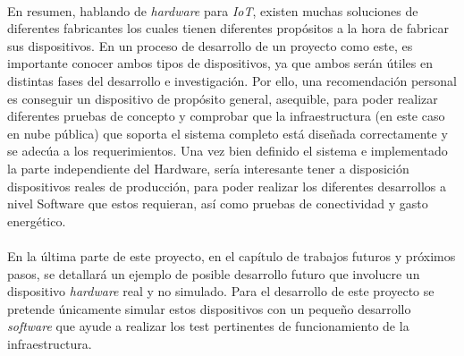 \documentclass[../../memoria.tex]{subfiles}
\begin{document}
\paragraph{}
En resumen, hablando de \textit{hardware} para \textit{IoT}, existen muchas soluciones de diferentes fabricantes los cuales tienen diferentes propósitos a la hora de fabricar sus dispositivos. En un proceso de desarrollo de un proyecto como este, es importante conocer ambos tipos de dispositivos, ya que ambos serán útiles en distintas fases del desarrollo e investigación. Por ello, una recomendación personal es conseguir un dispositivo de propósito general, asequible, para poder realizar diferentes pruebas de concepto y comprobar que la infraestructura (en este caso en nube pública) que soporta el sistema completo está diseñada correctamente y se adecúa a los requerimientos. Una vez bien definido el sistema e implementado la parte independiente del Hardware, sería interesante tener a disposición dispositivos reales de producción, para poder realizar los diferentes desarrollos a nivel Software que estos requieran, así como pruebas de conectividad y gasto energético.

\paragraph{}
En la última parte de este proyecto, en el capítulo de trabajos futuros y próximos pasos, se detallará un ejemplo de posible desarrollo futuro que involucre un dispositivo \textit{hardware} real y no simulado. Para el desarrollo de este proyecto se pretende únicamente simular estos dispositivos con un pequeño desarrollo \textit{software} que ayude a realizar los test pertinentes de funcionamiento de la infraestructura.
\end{document}
